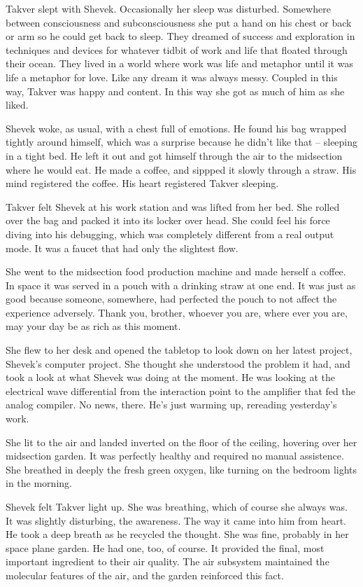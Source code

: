 Takver slept with Shevek.  Occasionally her sleep was disturbed.
Somewhere between consciousness and subconsciousness she put a hand on
his chest or back or arm so he could get back to sleep.  They dreamed
of success and exploration in techniques and devices for whatever
tidbit of work and life that floated through their ocean.  They lived
in a world where work was life and metaphor until it was life a
metaphor for love.  Like any dream it was always messy.  Coupled in
this way, Takver was happy and content.  In this way she got as much
of him as she liked.

Shevek woke, as usual, with a chest full of emotions.  He found his
bag wrapped tightly around himself, which was a surprise because he
didn't like that -- sleeping in a tight bed.  He left it out and got
himself through the air to the midsection where he would eat.  He made
a coffee, and sippped it slowly through a straw.  His mind registered
the coffee.  His heart registered Takver sleeping.

Takver felt Shevek at his work station and was lifted from her bed.
She rolled over the bag and packed it into its locker over head.  She
could feel his force diving into his debugging, which was completely
different from a real output mode.  It was a faucet that had only the
slightest flow.

She went to the midsection food production machine and made herself a
coffee.  In space it was served in a pouch with a drinking straw at
one end.  It was just as good because someone, somewhere, had
perfected the pouch to not affect the experience adversely.  Thank
you, brother, whoever you are, where ever you are, may your day be as
rich as this moment.

She flew to her desk and opened the tabletop to look down on her
latest project, Shevek's computer project.  She thought she understood
the problem it had, and took a look at what Shevek was doing at the
moment.  He was looking at the electrical wave differential from the
interaction point to the amplifier that fed the analog compiler.  No
news, there.  He's just warming up, rereading yesterday's work.

She lit to the air and landed inverted on the floor of the ceiling,
hovering over her midsection garden.  It was perfectly healthy and
required no manual assistence.  She breathed in deeply the fresh green
oxygen, like turning on the bedroom lights in the morning.

Shevek felt Takver light up.  She was breathing, which of course she
always was.  It was slightly disturbing, the awareness.  The way it
came into him from heart.  He took a deep breath as he recycled the
thought.  She was fine, probably in her space plane garden.  He had
one, too, of course.  It provided the final, most important ingredient
to their air quality.  The air subsystem maintained the molecular
features of the air, and the garden reinforced this fact.

